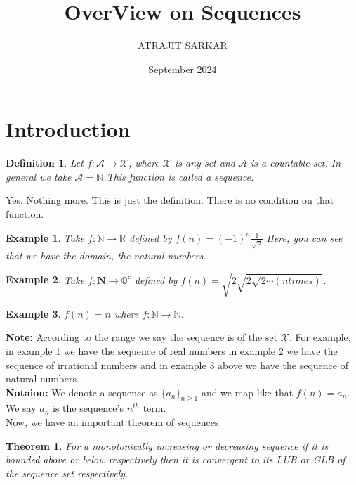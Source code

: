 \documentclass{article}
\title{OverView on Sequences}
\author{ATRAJIT SARKAR}
\date{September 2024}
\newtheorem{defn}{Definition}[section]
\newtheorem{exdef}{Example}[defn]
\newtheorem{theorem}{Theorem}[section]
\begin{document}
\maketitle

\section{Introduction}
\begin{defn}
    Let $f:\mathcal{A}\rightarrow \mathcal{X}$, where $\mathcal{X}$ is any set and $\mathcal{A}$ is a countable set. In general we take $\mathcal{A}=\mathbb{N}$.This function is called a sequence.
\end{defn}

Yes. Nothing more. This is just the definition. There is no condition on that function. \\
\begin{exdef}
    Take $f:\mathbb{N}\rightarrow \mathbb{R}$ defined by $f(n)=(-1)^n\frac{1}{\sqrt{n}}$.Here, you can see that we have the domain, the natural numbers.
\end{exdef}

\begin{exdef}
    Take $f:\mathbf{N}\rightarrow \mathbb{Q}^c$ defined by $f(n)=\sqrt{2\sqrt{2\sqrt{2 \cdots(n times)}}}$.
\end{exdef}

\begin{exdef}
    $f(n)=n$ where $f:\mathbb{N}\rightarrow \mathbb{N}$.
\end{exdef}

\textbf{Note:} According to the range we say the sequence is of the set $\mathcal{X}$. For example, in example 1 we have the sequence of real numbers in example 2 we have the sequence of irrational numbers and in example 3 above we have the sequence of natural numbers.\\

\textbf{Notaion:} We denote a sequence as $\{a_n\}_{n\geq 1}$ and we map like that $f(n)=a_n$. We say $a_n$ is the sequence's $n^{th}$ term. \\
Now, we have an important theorem of sequences.

\begin{theorem}
    For a monotonically increasing or decreasing sequence if it is bounded above or below respectively then it is convergent to its LUB or GLB of the sequence set respectively.
\end{theorem}
\end{document}
